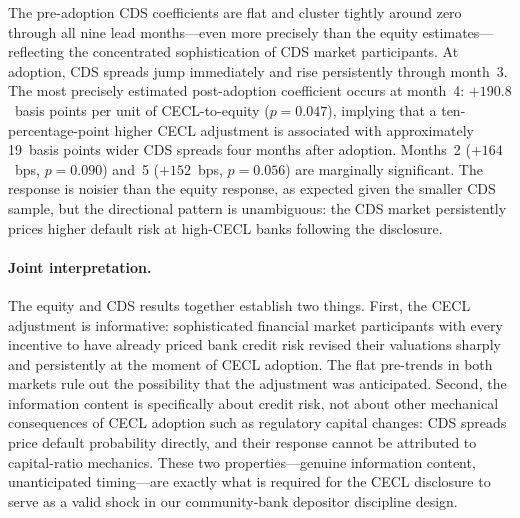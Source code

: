 The pre-adoption CDS coefficients are flat and cluster tightly around zero
through all nine lead months---even more precisely than the equity
estimates---reflecting the concentrated sophistication of CDS market
participants. At adoption, CDS spreads jump immediately and rise persistently
through month~3. The most precisely estimated post-adoption coefficient occurs at
month~4: $+190.8$~basis points per unit of CECL-to-equity ($p = 0.047$),
implying that a ten-percentage-point higher CECL adjustment is associated with
approximately 19~basis points wider CDS spreads four months after adoption.
Months~2 ($+164$~bps, $p = 0.090$) and~5 ($+152$~bps, $p = 0.056$) are
marginally significant. The response is noisier than the equity response, as
expected given the smaller CDS sample, but the directional pattern is
unambiguous: the CDS market persistently prices higher default risk at
high-CECL banks following the disclosure.

\paragraph{Joint interpretation.}
The equity and CDS results together establish two things. First, the CECL
adjustment is informative: sophisticated financial market participants with every
incentive to have already priced bank credit risk revised their valuations
sharply and persistently at the moment of CECL adoption. The flat pre-trends in
both markets rule out the possibility that the adjustment was anticipated. Second,
the information content is specifically about credit risk, not about other
mechanical consequences of CECL adoption such as regulatory capital changes: CDS
spreads price default probability directly, and their response cannot be
attributed to capital-ratio mechanics. These two properties---genuine information
content, unanticipated timing---are exactly what is required for the CECL
disclosure to serve as a valid shock in our community-bank depositor discipline
design.